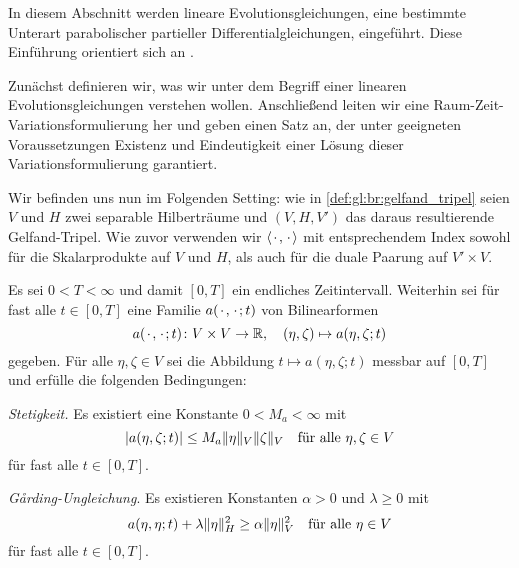 In diesem Abschnitt werden lineare Evolutionsgleichungen, eine bestimmte Unterart parabolischer partieller Differentialgleichungen, eingeführt.
Diese Einführung orientiert sich an \textcite{Lions:1971wp,Schwab:2009ec,Urban:2014kg}.

Zunächst definieren wir, was wir unter dem Begriff einer linearen Evolutionsgleichungen verstehen wollen.
Anschließend leiten wir eine Raum-Zeit-Variationsformulierung her und geben einen Satz an, der unter geeigneten Voraussetzungen Existenz und Eindeutigkeit einer Lösung dieser Variationsformulierung garantiert.

Wir befinden uns nun im Folgenden Setting:
wie in \cref{def:gl:br:gelfand_tripel} seien $V$ und $H$ zwei separable Hilberträume und $(V, H, V')$ das daraus resultierende Gelfand-Tripel.
Wie zuvor verwenden wir $\left\langle{\mkern2mu\cdot\mkern2mu},{\mkern2mu\cdot\mkern2mu}\right\rangle$ mit entsprechendem Index sowohl für die Skalarprodukte auf $V$ und $H$, als auch für die duale Paarung auf $V' \times V$.

Es sei $0 < T < \infty$ und damit $[0, T]$ ein endliches Zeitintervall.
Weiterhin sei für fast alle $t \in [0, T]$ eine Familie $a({\mkern2mu\cdot\mkern2mu}, {\mkern2mu\cdot\mkern2mu}; t)$ von Bilinearformen
\begin{equation}
    \label{eq:gl:le:bilinearformen_familie}
    a(\blank, \blank; t) \colon V \times V \to \mathbb{R}, \quad (\eta, \zeta) \mapsto a(\eta, \zeta; t)
\end{equation}
gegeben.
Für alle $\eta, \zeta \in V$ sei die Abbildung $t \mapsto a(\eta, \zeta; t)$ messbar auf $[0, T]$ und erfülle die folgenden Bedingungen:

\begin{Annahme}
\label{ann:gl:le:bilinearform_eigenschaften}
    \leavevmode
    \begin{thmenumerate}
        \item \emph{Stetigkeit.}
        Es existiert eine Konstante $0 < M_{a} < \infty$ mit
        \begin{equation}
            \label{eq:gl:le:bilinearform_stetig}
            \abs{a(\eta, \zeta; t)} \leq M_{a} \norm{\eta}_{V} \norm{\zeta}_{V} \quad \fa \eta, \zeta \in V
        \end{equation}
        für fast alle $t \in [0, T]$.
        \item \emph{G\r{a}rding-Ungleichung}.
        Es existieren Konstanten $\alpha > 0$ und $\lambda \geq 0$ mit
        \begin{equation}
            \label{eq:gl:le:bilinearform_garding}
            a(\eta, \eta; t) + \lambda \norm{\eta}_{H}^{2} \geq \alpha \norm{\eta}_{V}^{2} \quad \fa \eta \in V
        \end{equation}
        für fast alle $t \in [0, T]$.
    \end{thmenumerate}
\end{Annahme}

